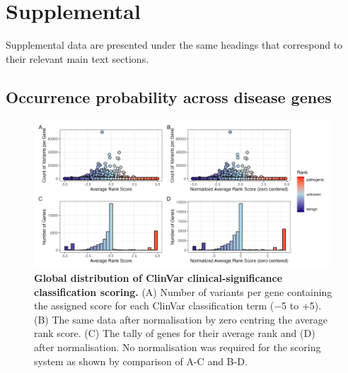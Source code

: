\beginsupplement
\section{Supplemental} \label{Supplemental_text}

Supplemental data are presented under the same headings that correspond to their relevant main text sections. 

\subsection{Occurrence probability across disease genes}

\begin{figure}[h]
  \centering
  \includegraphics[width=0.99\textwidth]{../images/p_gene_summary_hist_patch3.png}
\caption{\textbf{Global distribution of ClinVar clinical-significance classification scoring.} 
(A) Number of variants per gene containing the assigned score for each ClinVar classification term (−5 to +5). 
(B) The same data after normalisation by zero centring the average rank score.
(C) The tally of genes for their average rank and (D) after normalisation. No normalisation was required for the scoring system as shown by comparison of A-C and B-D.}
  \label{fig:p_gene_summary_hist_patch3}
\end{figure}

